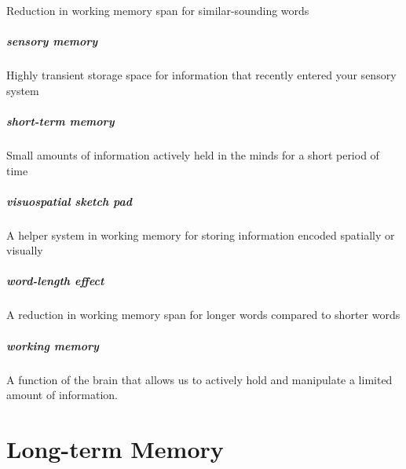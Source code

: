 \documentclass[
]{krantz}
\begin{document}
Reduction in working memory span for similar-sounding words

\paragraph*{sensory memory}\label{sensory-memory}

Highly transient storage space for information that recently entered your sensory system

\paragraph*{short-term memory}\label{short-term-memory-1}

Small amounts of information actively held in the minds for a short period of time

\paragraph*{visuospatial sketch pad}\label{visuospatial-sketch-pad}

A helper system in working memory for storing information encoded spatially or visually

\paragraph*{word-length effect}\label{word-length-effect}

A reduction in working memory span for longer words compared to shorter words

\paragraph*{working memory}\label{working-memory-1}

A function of the brain that allows us to actively hold and manipulate a limited amount of information.

\chapter{Long-term Memory}\label{long-term-memory-chapter}
\end{document}

